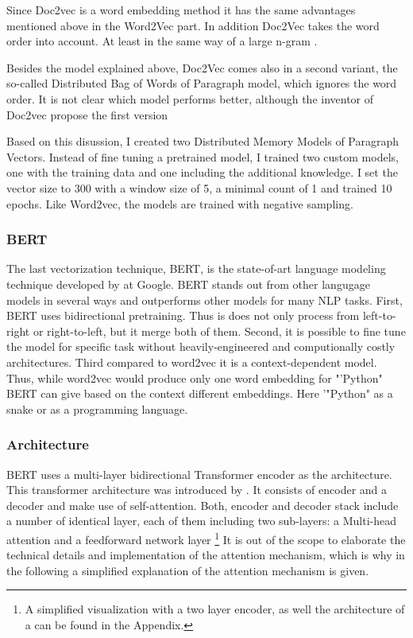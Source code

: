 \documentclass[12pt, a4paper, titlepage]{article}
\begin{document}
Since Doc2vec is a word embedding method it has the same advantages mentioned above in the Word2Vec part. In addition Doc2Vec takes the word order into account. At least in the same way of a large n-gram \citep{le2014}. 

Besides the model explained above, Doc2Vec comes also in a second variant, the so-called Distributed Bag of Words of Paragraph model, which ignores the word order. It is not clear which model performs better, although the inventor of Doc2vec propose the first version \citep{lau2016}

Based on this disussion, I created two Distributed Memory Models of Paragraph Vectors. Instead of fine tuning a pretrained model, I trained two custom models, one with the training data and one including the additional knowledge. I set the vector size to 300 with a window size of 5, a minimal count of 1 and trained 10 epochs. Like Word2vec, the models are trained with negative sampling.  

\subsubsection{BERT}
The last vectorization technique, \ac{BERT}, is the state-of-art language modeling technique developed by \citep{devlin2018} at Google. \ac{BERT} stands out from other langugage models in several ways and outperforms other models for many \ac{NLP} tasks. First, \ac{BERT} uses bidirectional pretraining. Thus is does not only process from left-to-right or right-to-left, but it merge both of them. Second, it is possible to fine tune the model for specific task without heavily-engineered and computionally costly architectures. Third compared to word2vec it is a context-dependent model. Thus, while word2vec would produce only one word embedding for "'Python" \ac{BERT} can give based on the context different embeddings. Here '"Python" as a snake or as a programming language. 

\subsubsection*{Architecture}
\ac{BERT} uses a multi-layer bidirectional Transformer encoder as the architecture. This transformer architecture was introduced by \citet{vaswani2017}. It consists of encoder and a decoder and make use of self-attention. Both, encoder and decoder stack include a number of identical layer, each of them including two sub-layers: a Multi-head attention and a feedforward network layer \footnote{A simplified visualization with a two layer encoder, as well the architecture of a  can be found in the Appendix.} It is out of the scope to elaborate the technical details and implementation of the attention mechanism, which is why in the following a simplified explanation of the attention mechanism is given. 
\end{document}
